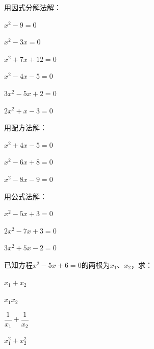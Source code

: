 \documentclass[a4paper,12pt]{ctexart}
\begin{document}

\begin{exercise}
\item 用因式分解法解：
  \begin{subexercise}
    \item $x^2-9=0$
    \item $x^2-3x=0$
    \item $x^2+7x+12=0$
    \item $x^2-4x-5=0$
    \item $3x^2-5x+2=0$
    \item $2x^2+x-3=0$
  \end{subexercise}

\item 用配方法解：
  \begin{subexercise}
    \item $x^2+4x-5=0$
    \item $x^2-6x+8=0$
    \item $x^2-8x-9=0$
  \end{subexercise}

\item 用公式法解：
  \begin{subexercise}
    \item $x^2-5x+3=0$
    \item $2x^2-7x+3=0$
    \item $3x^2+5x-2=0$
  \end{subexercise}

\item 已知方程$x^2-5x+6=0$的两根为$x_1$、$x_2$，求：
  \begin{subexercise}
    \item $x_1+x_2$
    \item $x_1x_2$
    \item $\dfrac{1}{x_1}+\dfrac{1}{x_2}$
    \item $x_1^2+x_2^2$
  \end{subexercise}
\end{exercise}

\newpage



\end{document}
